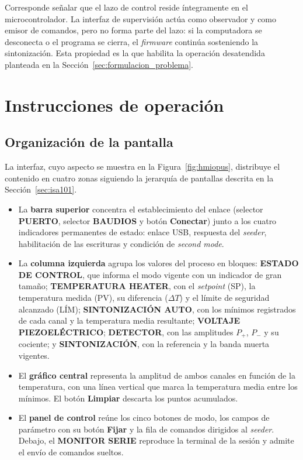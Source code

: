Corresponde señalar que el lazo de control reside íntegramente en el microcontrolador. La interfaz de supervisión actúa como observador y como emisor de comandos, pero no forma parte del lazo: si la computadora se desconecta o el programa se cierra, el \emph{firmware} continúa sosteniendo la sintonización. Esta propiedad es la que habilita la operación desatendida planteada en la Sección~\ref{sec:formulacion_problema}.

\section{Instrucciones de operación}
\label{sec:me-manual}

\subsection{Organización de la pantalla}

La interfaz, cuyo aspecto se muestra en la Figura~\ref{fig:hmiopus}, distribuye el contenido en cuatro zonas siguiendo la jerarquía de pantallas descrita en la
Sección~\ref{sec:isa101}.

\begin{itemize}
      \item La \textbf{barra superior} concentra el establecimiento del enlace (selector
        \textbf{PUERTO}, selector \textbf{BAUDIOS} y botón \textbf{Conectar}) junto a
        los cuatro indicadores permanentes de estado: enlace USB, respuesta del
        \emph{seeder}, habilitación de las escrituras y condición de \emph{second mode}.
      \item La \textbf{columna izquierda} agrupa los valores del proceso en bloques:
        \textbf{ESTADO DE CONTROL}, que informa el modo vigente con un indicador de
        gran tamaño; \textbf{TEMPERATURA HEATER}, con el \emph{setpoint} (SP), la
        temperatura medida (PV), su diferencia ($\Delta T$) y el límite de seguridad
        alcanzado (LÍM); \textbf{SINTONIZACIÓN AUTO}, con los mínimos registrados de
        cada canal y la temperatura media resultante; \textbf{VOLTAJE
        PIEZOELÉCTRICO}; \textbf{DETECTOR}, con las amplitudes $P_+$, $P_-$ y su
        cociente; y \textbf{SINTONIZACIÓN}, con la referencia y la banda muerta
        vigentes.
      \item El \textbf{gráfico central} representa la amplitud de ambos canales en
        función de la temperatura, con una línea vertical que marca la temperatura
        media entre los mínimos. El botón \textbf{Limpiar} descarta los puntos
        acumulados.
       \item El \textbf{panel de control} reúne los cinco botones de modo, los campos de parámetro con su botón \textbf{Fijar} y la fila de comandos dirigidos al \emph{seeder}. Debajo, el \textbf{MONITOR SERIE} reproduce la terminal de la sesión y admite el envío de comandos sueltos.
\end{itemize}

